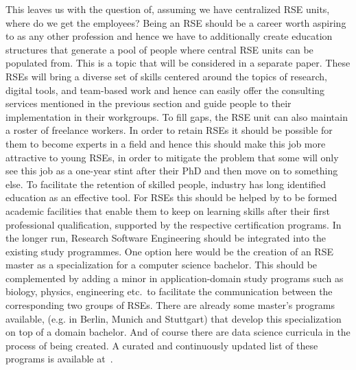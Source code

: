\documentclass[a4paper]{article}
\makeatletter
\newcommand*{\eg}{e.g.\@\xspace}
\makeatother
\begin{document}
This leaves us with the question of, assuming we have centralized RSE units, where do we get the employees?
Being an RSE should be a career worth aspiring to as any other profession and hence we have to additionally create education structures that generate a pool of people where central RSE units can be populated from.
This is a topic that will be considered in a separate paper.
These RSEs will bring a diverse set of skills centered around the topics of research,
digital tools, and team-based work and hence can easily offer the consulting services mentioned in the previous section and guide people to their implementation in their workgroups.
To fill gaps, the RSE unit can also maintain a roster of freelance workers.
In order to retain RSEs it should be possible for them to become experts in a field and hence this should make this job more attractive to young RSEs,
in order to mitigate the problem that some will only see this job as a one-year stint after their PhD and then move on to something else.
To facilitate the retention of skilled people, industry has long identified education as an effective tool.
For RSEs this should be helped by to be formed academic facilities that enable them to keep on learning skills after their first professional qualification, supported by the respective certification programs.
In the longer run, Research Software Engineering should be integrated into the existing study programmes.
One option here would be the creation of an RSE master as a specialization for a computer science bachelor.
This should be complemented by adding a minor in application-domain study programs such as biology, physics, engineering etc.\ to facilitate the communication between the corresponding two groups of RSEs.
There are already some master's programs available, (\eg{} in Berlin, Munich and Stuttgart) that develop this specialization on top of a domain bachelor.
And of course there are data science curricula in the process of being created.
A curated and continuously updated list of these programs is available at~\cite{learnandteachlearn}.

\printbibliography[heading=bibintoc]
\end{document}
